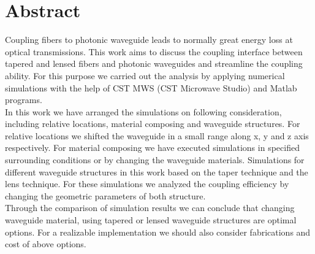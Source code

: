 \chapter*{Abstract}
\label{cha:kurzfassung}
Coupling fibers to photonic waveguide leads to normally great energy loss at optical transmissions. This work aims to discuss the coupling interface between tapered and lensed fibers and photonic waveguides and streamline the coupling ability. For this purpose we carried out the analysis by applying numerical simulations with the help of CST MWS (CST Microwave Studio\textregistered) and Matlab programs. \\

In this work we have arranged the simulations on following consideration, including relative locations, material composing and waveguide structures. For relative locations we shifted the waveguide in a small range along x, y and z axis respectively. For material composing we have executed simulations in specified surrounding conditions or by changing the waveguide materials.  Simulations for different waveguide structures in this work based on the taper technique and the lens technique. For these simulations we analyzed the coupling efficiency by changing the geometric parameters of both structure.\\

Through the comparison of simulation results we can conclude that changing waveguide material, using tapered or lensed waveguide structures are optimal options. For a realizable implementation we should also consider fabrications and cost of above options.
